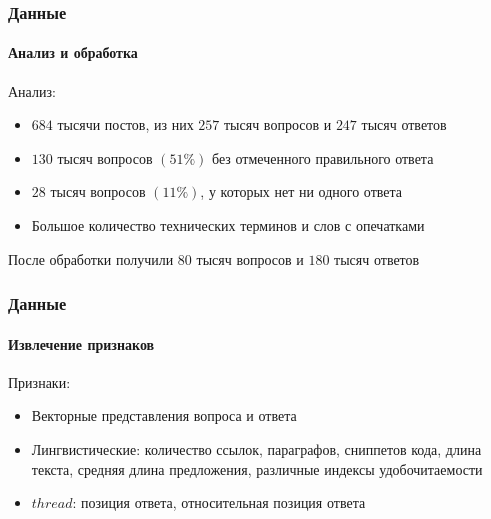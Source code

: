 \documentclass[10pt]{beamer}
\begin{document}

\begin{frame}
\frametitle{Данные}
\framesubtitle{Анализ и обработка}

Анализ:

\begin{itemize}
	\item $684$ тысячи постов, из них $257$ тысяч вопросов и $247$ тысяч ответов
	\item $130$ тысяч вопросов $(51\%)$ без отмеченного правильного ответа
	\item $28$ тысяч вопросов $(11\%)$, у которых нет ни одного ответа
	\item Большое количество технических терминов и слов с опечатками
\end{itemize}

После обработки получили $80$ тысяч вопросов и $180$ тысяч ответов

\end{frame}


\begin{frame}
\frametitle{Данные}
\framesubtitle{Извлечение признаков}

Признаки:

\begin{itemize}
	\item Векторные представления вопроса и ответа
	\item Лингвистические: количество ссылок, параграфов, сниппетов кода, длина текста, средняя длина предложения, различные индексы удобочитаемости
	\item $thread$: позиция ответа, относительная позиция ответа
\end{itemize}

\end{frame}

\end{document}
